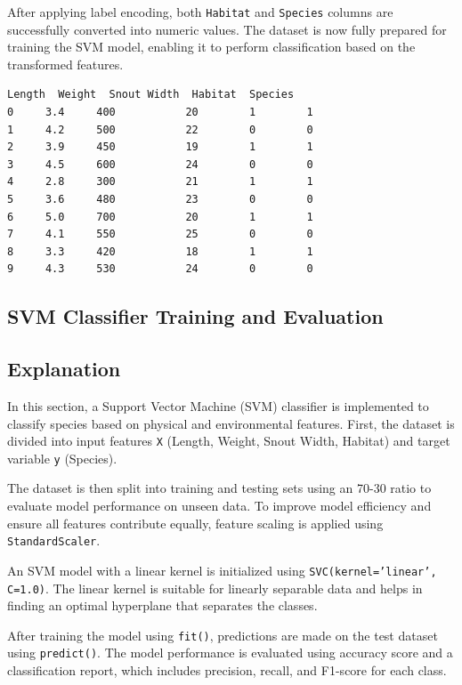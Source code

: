 \documentclass[11pt]{article}
\makeatletter
\newcommand{\boxspacing}{\kern\kvtcb@left@rule\kern\kvtcb@boxsep}
\newcommand{\prompt}[4]{
        {\ttfamily\llap{{\color{#2}[#3]:\hspace{3pt}#4}}\vspace{-\baselineskip}}
    }
\makeatother
\begin{document}
After applying label encoding, both \texttt{Habitat} and \texttt{Species} columns are successfully converted into numeric values. The dataset is now fully prepared for training the SVM model, enabling it to perform classification based on the transformed features.
            \begin{tcolorbox}[breakable, size=fbox, boxrule=.5pt, pad at break*=1mm, opacityfill=0]
\prompt{Out}{outcolor}{3}{\boxspacing}
\begin{Verbatim}[commandchars=\\\{\}]
   Length  Weight  Snout Width  Habitat  Species
0     3.4     400           20        1        1
1     4.2     500           22        0        0
2     3.9     450           19        1        1
3     4.5     600           24        0        0
4     2.8     300           21        1        1
5     3.6     480           23        0        0
6     5.0     700           20        1        1
7     4.1     550           25        0        0
8     3.3     420           18        1        1
9     4.3     530           24        0        0
\end{Verbatim}
\end{tcolorbox}

\subsection{SVM Classifier Training and Evaluation}
\subsection*{Explanation}

In this section, a Support Vector Machine (SVM) classifier is implemented to classify species based on physical and environmental features. First, the dataset is divided into input features \texttt{X} (Length, Weight, Snout Width, Habitat) and target variable \texttt{y} (Species).

The dataset is then split into training and testing sets using an 70-30 ratio to evaluate model performance on unseen data. To improve model efficiency and ensure all features contribute equally, feature scaling is applied using \texttt{StandardScaler}.

An SVM model with a linear kernel is initialized using \texttt{SVC(kernel='linear', C=1.0)}. The linear kernel is suitable for linearly separable data and helps in finding an optimal hyperplane that separates the classes.

After training the model using \texttt{fit()}, predictions are made on the test dataset using \texttt{predict()}. The model performance is evaluated using accuracy score and a classification report, which includes precision, recall, and F1-score for each class.
        
\end{document}
